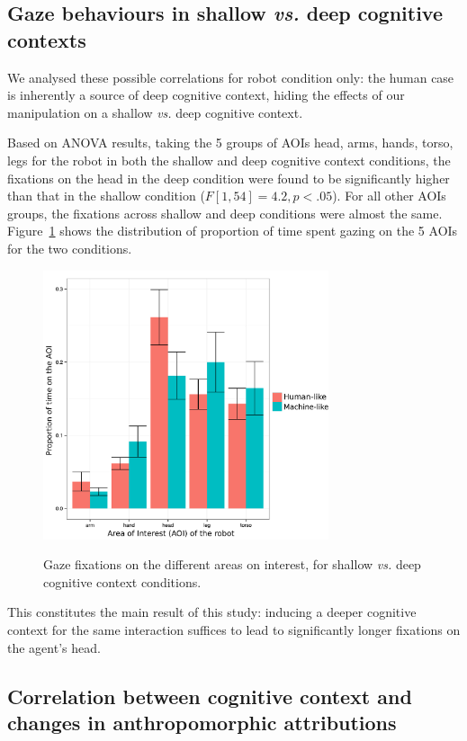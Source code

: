 \documentclass[lettersize, noapacite, twoside, HRI]{apa_HRI}
\newcommand{\vs}{\textit{vs.}\xspace}
\begin{document}
\subsection{Gaze behaviours in shallow \vs deep cognitive contexts}

We analysed these possible correlations for robot condition only: the human case is
inherently a source of deep cognitive context, hiding the effects of our
manipulation on a shallow \vs deep cognitive context.

Based on ANOVA results, taking the 5 groups of AOIs {\sf head}, {\sf arms}, {\sf
hands}, {\sf torso}, {\sf legs} for the robot in both the shallow and deep
cognitive context conditions, the fixations on the head in the deep condition
were found to be significantly higher than that in the shallow condition
($F[1,54] = 4.2, p < .05$). For all other AOIs groups, the fixations across
shallow and deep conditions were almost the same. Figure~\ref{h3} shows the
distribution of proportion of time spent gazing on the 5 AOIs for the two
conditions.

\begin{figure}
    \centering
    \includegraphics[width=3.3in]{GazeHighLow}\label{GazeHighLow}
    \caption{Gaze fixations on the different areas on interest, for shallow \vs
    deep cognitive context conditions.}
    \label{h3}
\end{figure}

This constitutes the main result of this study: inducing a deeper cognitive
context for the same interaction suffices to lead to significantly longer
fixations on the agent's head.

\subsection{Correlation between cognitive context and changes in anthropomorphic
attributions}
\end{document}
